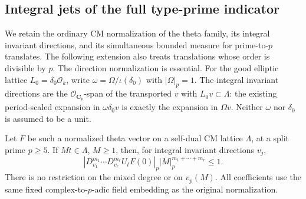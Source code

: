 \subsection{Integral jets of the full type-prime indicator}
\label{sec:full-type-prime-jets}

We retain the ordinary CM normalization of the theta family,
its integral invariant directions, and its simultaneous bounded
measure for prime-to-$p$ translates. The following extension
also treats translations whose order is divisible by $p$.
The direction normalization is essential. For the good
elliptic lattice $L_0=\delta_0\mathcal O_k$, write
$\omega=\Omega/\iota(\delta_0)$ with $|\Omega|_p=1$.
The integral invariant directions are the
$\mathcal O_{\mathbf C_p}$-span of the transported $v$
with $L_0v\subset\Lambda$: the existing period-scaled
expansion in $\omega\delta_0v$ is exactly the expansion
in $\Omega v$. Neither $\omega$ nor $\delta_0$ is assumed
to be a unit.

\begin{proposition}\label{prop:torsion-dilation-jets}
Let $F$ be such a normalized theta vector on a self-dual CM
lattice $\Lambda$, at a split prime $p\ge5$. If $Mt\in\Lambda$,
$M\ge1$, then, for integral invariant directions $v_j$,
\[
 \left|D_{v_1}^{m_1}\cdots D_{v_r}^{m_r}U_tF(0)\right|_p
                     |M|_p^{m_1+\cdots+m_r}\le1.
\]
There is no restriction on the mixed degree or on $v_p(M)$.
All coefficients use the same fixed complex-to-$p$-adic
field embedding as the original normalization.
\end{proposition}

